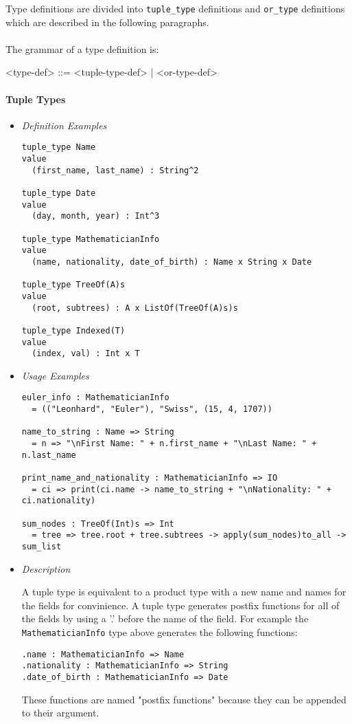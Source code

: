 \documentclass{article}
\begin{document}
Type definitions are divided into \texttt{tuple_type} definitions and
\texttt{or_type} definitions which are described in the following paragraphs.
\\\\
The grammar of a type definition is:
\begin{grammar}
<type-def> ::= <tuple-type-def> | <or-type-def>
\end{grammar}

\paragraph{Tuple Types}

\begin{itemize}
\item \textit{Definition Examples}

\begin{verbatim}
tuple_type Name
value
  (first_name, last_name) : String^2

tuple_type Date
value
  (day, month, year) : Int^3

tuple_type MathematicianInfo
value
  (name, nationality, date_of_birth) : Name x String x Date

tuple_type TreeOf(A)s
value
  (root, subtrees) : A x ListOf(TreeOf(A)s)s

tuple_type Indexed(T)
value
  (index, val) : Int x T
\end{verbatim}

\item \textit{Usage Examples}

\begin{verbatim}
euler_info : MathematicianInfo
  = (("Leonhard", "Euler"), "Swiss", (15, 4, 1707))

name_to_string : Name => String
  = n => "\nFirst Name: " + n.first_name + "\nLast Name: " + n.last_name

print_name_and_nationality : MathematicianInfo => IO
  = ci => print(ci.name -> name_to_string + "\nNationality: " + ci.nationality)

sum_nodes : TreeOf(Int)s => Int
  = tree => tree.root + tree.subtrees -> apply(sum_nodes)to_all -> sum_list
\end{verbatim}

\item \textit{Description}

A tuple type is equivalent to a product type with a new name  and names for the
fields for convinience. A tuple type generates postfix functions for all of
the fields by using a '.' before the name of the field. For example the
\texttt{MathematicianInfo} type above generates the following functions:
\begin{verbatim}
.name : MathematicianInfo => Name
.nationality : MathematicianInfo => String
.date_of_birth : MathematicianInfo => Date
\end{verbatim}
These functions are named "postfix functions" because they can be appended to
their argument.


\end{itemize}
\end{document}
